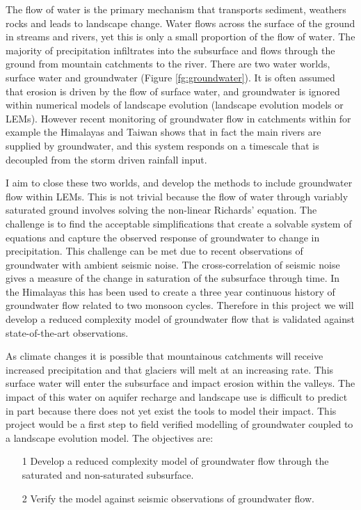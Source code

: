 The flow of water is the primary mechanism that transports sediment, weathers rocks and leads to landscape change. Water flows across the surface of the ground in streams and rivers, yet this is only a small proportion of the flow of water. The majority of precipitation infiltrates into the subsurface and flows through the ground from mountain catchments to the river. There are two water worlds, surface water and groundwater (Figure \ref{fg:groundwater}). It is often assumed that erosion is driven by the flow of surface water, and groundwater is ignored within numerical models of landscape evolution (landscape evolution models or LEMs). However recent monitoring of groundwater flow in catchments within for example the Himalayas and Taiwan shows that in fact the main rivers are supplied by groundwater, and this system responds on a timescale that is decoupled from the storm driven rainfall input.

I aim to close these two worlds, and develop the methods to include groundwater flow within LEMs. This is not trivial because the flow of water through variably saturated ground involves solving the non-linear Richards' equation. The challenge is to find the acceptable simplifications that create a solvable system of equations and capture the observed response of groundwater to change in precipitation. This challenge can be met due to recent observations of groundwater with ambient seismic noise. The cross-correlation of seismic noise gives a measure of the change in saturation of the subsurface through time. In the Himalayas this has been used to create a three year continuous history of groundwater flow related to two monsoon cycles. Therefore in this project we will develop a reduced complexity model of groundwater flow that is validated against state-of-the-art observations.

As climate changes it is possible that mountainous catchments will receive increased precipitation and that glaciers will melt at an increasing rate. This surface water will enter the subsurface and impact erosion within the valleys. The impact of this water on aquifer recharge and landscape use is difficult to predict in part because there does not yet exist the tools to model their impact. This project would be a first step to field verified modelling of groundwater coupled to a landscape evolution model. The objectives are:
\begin{itemize}
    \item[1] Develop a reduced complexity model of groundwater flow through the saturated and non-saturated subsurface.
    \item[2] Verify the model against seismic observations of groundwater flow.
\end{itemize}


